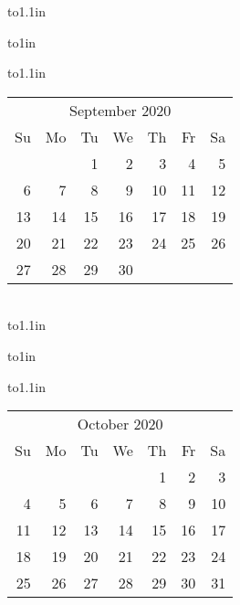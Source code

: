 \documentclass[12pt]{article}
\begin{document}
\begin{center}
{\month\hspace*{0.5in}%
\def\month{\hbox to1.1in{%
\vbox to1in{%
\vfil  \hbox to1.1in{%
\hfil\scriptsize\begin{tabular}{@{\hspace{0mm}}r@{\hspace{1mm}}r@{\hspace{1mm}}r@{\hspace{1mm}}r@{\hspace{1mm}}r@{\hspace{1mm}}r@{\hspace{1mm}}r@{\hspace{0mm}}}%
\multicolumn{7}{c}{September 2020}\\[1mm]
Su & Mo & Tu & We & Th & Fr & Sa\\[0.7mm]
 &  & 1 & 2 & 3 & 4 & 5\\[0.5mm]
6 & 7 & 8 & 9 & 10 & 11 & 12\\[0.5mm]
13 & 14 & 15 & 16 & 17 & 18 & 19\\[0.5mm]
20 & 21 & 22 & 23 & 24 & 25 & 26\\[0.5mm]
27 & 28 & 29 & 30 & 
\end{tabular}\hfil}\vfil}}}%
\month\hspace*{0.5in}%
\\[0.5in]%
\def\month{\hbox to1.1in{%
\vbox to1in{%
\vfil  \hbox to1.1in{%
\hfil\scriptsize\begin{tabular}{@{\hspace{0mm}}r@{\hspace{1mm}}r@{\hspace{1mm}}r@{\hspace{1mm}}r@{\hspace{1mm}}r@{\hspace{1mm}}r@{\hspace{1mm}}r@{\hspace{0mm}}}%
\multicolumn{7}{c}{October 2020}\\[1mm]
Su & Mo & Tu & We & Th & Fr & Sa\\[0.7mm]
 &  &  &  & 1 & 2 & 3\\[0.5mm]
4 & 5 & 6 & 7 & 8 & 9 & 10\\[0.5mm]
11 & 12 & 13 & 14 & 15 & 16 & 17\\[0.5mm]
18 & 19 & 20 & 21 & 22 & 23 & 24\\[0.5mm]
25 & 26 & 27 & 28 & 29 & 30 & 31
\end{tabular}\hfil}\vfil}}}%
\month\hspace*{0.5in}%
\def\month{\hbox to1.1in{%
\vbox to1in{%
}}}}
\end{center}
\end{document}
